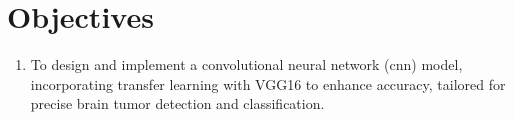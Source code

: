 \section{Objectives}
\begin{enumerate}[label=\roman*.]
    \item To design and implement a convolutional neural network (\gls{cnn}) model, incorporating transfer learning with VGG16 to enhance accuracy, tailored for precise brain tumor detection and classification.
\end{enumerate}